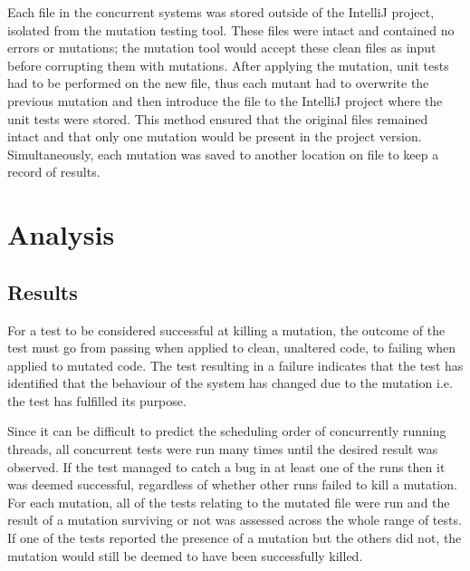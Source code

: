 \documentclass[a4paper,12pt]{article}
\begin{document}
Each file in the concurrent systems was stored outside of the IntelliJ project, isolated from the mutation testing tool. These files were intact and contained no errors or mutations; the mutation tool would accept these clean files as input before corrupting them with mutations. After applying the mutation, unit tests had to be performed on the new file, thus each mutant had to overwrite the previous mutation and then introduce the file to the IntelliJ project where the unit tests were stored. This method ensured that the original files remained intact and that only one mutation would be present in the project version. Simultaneously, each mutation was saved to another location on file to keep a record of results.


\newpage	
\section{Analysis}
\subsection{Results}

For a test to be considered successful at killing a mutation, the outcome of the test must go from passing when applied to clean, unaltered code, to failing when applied to mutated code. The test resulting in a failure indicates that the test has identified that the behaviour of the system has changed due to the mutation i.e. the test has fulfilled its purpose. 

Since it can be difficult to predict the scheduling order of concurrently running threads, all concurrent tests were run many times until the desired result was observed. If the test managed to catch a bug in at least one of the runs then it was deemed successful, regardless of whether other runs failed to kill a mutation. For each mutation, all of the tests relating to the mutated file were run and the result of a mutation surviving or not was assessed across the whole range of tests. If one of the tests reported the presence of a mutation but the others did not, the mutation would still be deemed to have been successfully killed.
\end{document}

